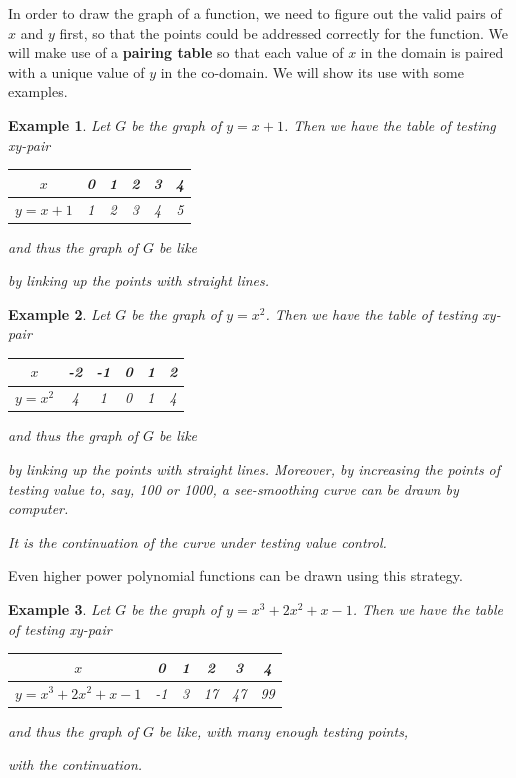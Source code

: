\documentclass[12pt]{article}
\newtheorem*{example}{Example}
\begin{document}
    In order to draw the graph of a function, we need to figure out the valid pairs of $x$ and $y$ first, so that the points could be addressed correctly for the function. We will make use of a \textbf{pairing table} so that each value of $x$ in the domain is paired with a unique value of $y$ in the co-domain. We will show its use with some examples.

    \begin{example}
        Let $G$ be the graph of $y=x+1$. Then we have the table of testing xy-pair 
        \begin{center}
            \begin{tabular}{|c|c|c|c|c|c|}
                \hline
                $x$&0&1&2&3&4\\
                \hline
                $y=x+1$&1&2&3&4&5\\
                \hline
            \end{tabular}
        \end{center}
        and thus the graph of $G$ be like

        by linking up the points with straight lines.
    \end{example}

    \begin{example}
        Let $G$ be the graph of $y=x^2$. Then we have the table of testing xy-pair 
        \begin{center}
            \begin{tabular}{|c|c|c|c|c|c|}
                \hline
                $x$&-2&-1&0&1&2\\
                \hline
                $y=x^2$&4&1&0&1&4\\
                \hline
            \end{tabular}
        \end{center}
        and thus the graph of $G$ be like

        by linking up the points with straight lines. Moreover, by increasing the points of testing value to, say, 100 or 1000, a see-smoothing curve can be drawn by computer.
        
        It is the continuation of the curve under testing value control.
    \end{example}

    Even higher power polynomial functions can be drawn using this strategy.
    \begin{example}
        Let $G$ be the graph of $y=x^3+2x^2+x-1$. Then we have the table of testing xy-pair 
        \begin{center}
            \begin{tabular}{|c|c|c|c|c|c|}
                \hline
                $x$&0&1&2&3&4\\
                \hline
                $y=x^3+2x^2+x-1$&-1&3&17&47&99\\
                \hline
            \end{tabular}
        \end{center}
        and thus the graph of $G$ be like, with many enough testing points, 

        with the continuation.
    \end{example}
\end{document}
